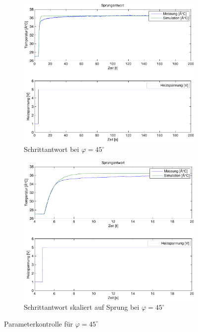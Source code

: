 \begin{figure}[h!]
    \begin{subfigure}{0.475\textwidth}
        \includegraphics[width=1\textwidth]{04/step_mod_sim_45.pdf}
        \caption{Schrittantwort bei $\varphi = 45^\circ$}
    \end{subfigure}
    \hfill{}
    \begin{subfigure}{0.475\textwidth}
        \includegraphics[width=1\textwidth]{04/step_mod_sim_45_scale.pdf}
        \caption{Schrittantwort skaliert auf Sprung bei $\varphi = 45^\circ$}
    \end{subfigure}
    \caption{Parameterkontrolle für $\varphi = 45^\circ$}
\end{figure}
